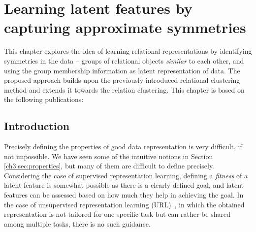\chapter{Learning latent features by capturing approximate symmetries}\label{ch:symmetries}

This chapter explores the idea of learning relational representations by identifying symmetries in the data -- groups of relational objects \textit{similar} to each other, and using the group membership information as latent representation of data.
The proposed approach builds upon the previously introduced relational clustering method and extends it towards the relation clustering.
This chapter is based on the following publications:

\begin{quote}
\end{quote}

\begin{quote}
\end{quote}

\begin{quote}
\end{quote}
 



\section{Introduction}




Precisely defining the properties of good data representation is very difficult, if not impossible.
We have seen some of the intuitive notions in Section \ref{ch3:sec:properties}, but many of them are difficult to define precisely.
Considering the case of supervised representation learning, defining a \textit{fitness} of a latent feature is somewhat possible as there is a clearly defined goal, and latent features can be assessed based on how much they help in achieving the goal. 
In the case of unsupervised representation learning (URL)~\cite{Hinton504,Bengio07greedylayer-wise,RanzatoBL07}, in which the obtained representation is not tailored for one specific task but can rather be shared among multiple tasks, there is no such guidance.







